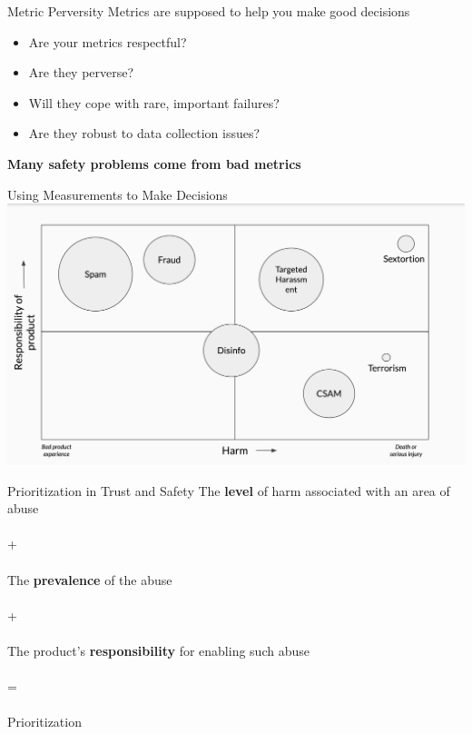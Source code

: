 \documentclass[nobackground,dvipsnames,table,aspectratio=169]{beamer}
\begin{document}
\begin{frame}{Metric Perversity}
    Metrics are supposed to help you make good decisions
    \vspace{0.05\textheight}
    \begin{itemize}
        \item Are your metrics respectful?
        \item Are they perverse?
        \item Will they cope with rare, important failures?
        \item Are they robust to data collection issues?
    \end{itemize}
    \vspace{0.1\textheight}
    \centering
    \large
    \textbf{Many safety problems come from bad metrics}
\end{frame}

\begin{frame}{Using Measurements to Make Decisions}
    \includegraphics[width=\textwidth]{responsibility-vs-harm}
\end{frame}

\begin{frame}{Prioritization in Trust and Safety}
    \centering
    The \textbf{level} of harm associated with an area of abuse\\~\\
    +\\~\\
    The \textbf{prevalence} of the abuse\\~\\
    +\\~\\
    The product’s \textbf{responsibility} for enabling such abuse\\~\\
    =\\~\\
    \large{Prioritization}
\end{frame}
\end{document}
